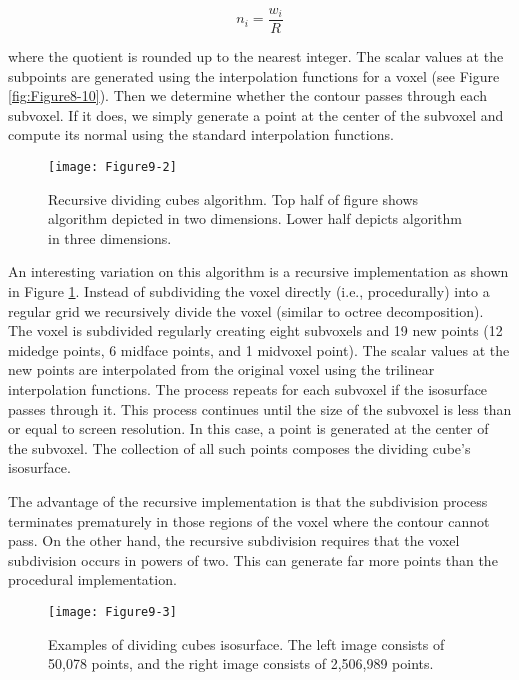 \begin{equation}\label{eq:9.1}
n_i = \dfrac{w_i}{R}
\end{equation}

where the quotient is rounded up to the nearest integer. The scalar values at the subpoints are generated using the interpolation functions for a voxel (see Figure \ref{fig:Figure8-10}). Then we determine whether the contour passes through each subvoxel. If it does, we simply generate a point at the center of the subvoxel and compute its normal using the standard interpolation functions.

\begin{figure}[!htb]
    \centering
    \texttt{[image: Figure9-2]}\\
    \caption{Recursive dividing cubes algorithm. Top half of figure shows algorithm depicted in two dimensions. Lower half depicts algorithm in three dimensions.}\label{fig:Figure9-2}
\end{figure}

An interesting variation on this algorithm is a recursive implementation as shown in Figure \ref{fig:Figure9-2}. Instead of subdividing the voxel directly (i.e., procedurally) into a regular grid we recursively divide the voxel (similar to octree decomposition). The voxel is subdivided regularly creating eight subvoxels and 19 new points (12 midedge points, 6 midface points, and 1 midvoxel point). The scalar values at the new points are interpolated from the original voxel using the trilinear interpolation functions. The process repeats for each subvoxel if the isosurface passes through it. This process continues until the size of the subvoxel is less than or equal to screen resolution. In this case, a point is generated at the center of the subvoxel. The collection of all such points composes the dividing cube's isosurface.

The advantage of the recursive implementation is that the subdivision process terminates prematurely in those regions of the voxel where the contour cannot pass. On the other hand, the recursive subdivision requires that the voxel subdivision occurs in powers of two. This can generate far more points than the procedural implementation.

\begin{figure}[!htb]
    \centering
    \texttt{[image: Figure9-3]}\\
    \caption{Examples of dividing cubes isosurface. The left image consists of 50,078 points, and the right image consists of 2,506,989 points.}\label{fig:Figure9-3}
\end{figure}

